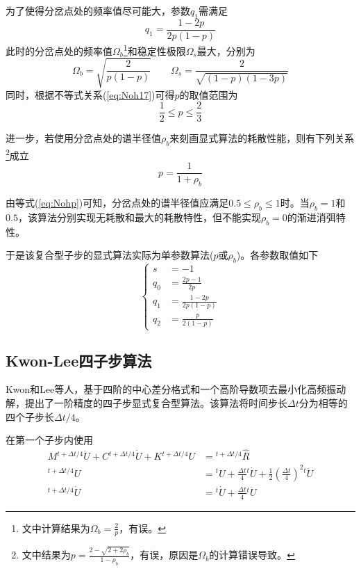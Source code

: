 为了使得分岔点处的频率值尽可能大，参数$q_1$需满足
\begin{equation}
q_1=\frac{1-2p}{2p(1-p)}
\end{equation}
此时的分岔点处的频率值$\Omega_b$\footnote{文中计算结果为$\Omega_b=\frac{2}{p}$，有误。}和稳定性极限$\Omega_s$最大，分别为
\begin{equation}
\Omega_b=\sqrt{\frac{2}{p(1-p)}}\qquad \Omega_s=\frac{2}{\sqrt{(1-p)(1-3p)}}
\end{equation}
同时，根据不等式关系(\ref{eq:Noh17})可得$p$的取值范围为
\begin{equation}
\frac{1}{2}\le p\le\frac{2}{3}\label{eq:Nohp}
\end{equation}

进一步，若使用分岔点处的谱半径值$\rho_b$来刻画显式算法的耗散性能，则有下列关系\footnote{文中结果为$p=\frac{2-\sqrt{2+2\rho_b}}{1-\rho_b}$，有误，原因是$\Omega_b$的计算错误导致。}成立
\begin{equation}
p=\frac{1}{1+\rho_b}\label{eq:Noh23}
\end{equation}

由等式(\ref{eq:Nohp})可知，分岔点处的谱半径值应满足$0.5\le\rho_b\le1$时。当$\rho_b=1$和$0.5$，该算法分别实现无耗散和最大的耗散特性，但不能实现$\rho_b=0$的渐进消弭特性。

于是该复合型子步的显式算法实际为单参数算法($p$或$\rho_b$)。各参数取值如下
\begin{equation}
\left\{\begin{aligned}
s&=-1\\
q_0&=\frac{2p-1}{2p}\\
q_1&=\frac{1-2p}{2p(1-p)}\\
q_2&=\frac{p}{2(1-p)}
\end{aligned}\right.
\end{equation}

\subsection{Kwon-Lee四子步算法}
Kwon和Lee等人\cite{Kwon2017a}，基于四阶的中心差分格式和一个高阶导数项去最小化高频振动解，提出了一阶精度的四子步显式复合型算法。该算法将时间步长$\Delta t$分为相等的四个子步长$\Delta t/4$。

在第一个子步内使用
\begin{equation}
\begin{split}
M{^{t+\Delta t/4}\!\ddot{U}}+C{^{t+\Delta t/4}\!\dot{U}}+K{^{t+\Delta t/4}\!{U}}&={^{t+\Delta t/4}\!\hat{R}}\\
{^{t+\Delta t/4}\!U}&={^t\!U}+\frac{\Delta t}{4}{^t\!\dot{U}}+\frac12\left(\frac{\Delta t}{4}\right)^2{^t\!\ddot{U}}\\
{^{t+\Delta t/4}\!\dot{U}}&={^t\!\dot{U}}+\frac{\Delta t}{4}{^t\!\ddot{U}}
\end{split}
\end{equation}

